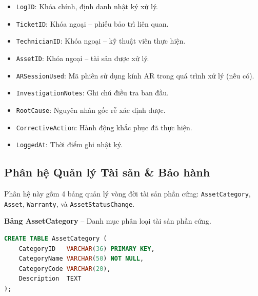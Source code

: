 \begin{itemize}[leftmargin=2em]
    \item \texttt{LogID}: Khóa chính, định danh nhật ký xử lý.
    \item \texttt{TicketID}: Khóa ngoại -- phiếu bảo trì liên quan.
    \item \texttt{TechnicianID}: Khóa ngoại -- kỹ thuật viên thực hiện.
    \item \texttt{AssetID}: Khóa ngoại -- tài sản được xử lý.
    \item \texttt{ARSessionUsed}: Mã phiên sử dụng kính AR trong quá trình xử lý (nếu có).
    \item \texttt{InvestigationNotes}: Ghi chú điều tra ban đầu.
    \item \texttt{RootCause}: Nguyên nhân gốc rễ xác định được.
    \item \texttt{CorrectiveAction}: Hành động khắc phục đã thực hiện.
    \item \texttt{LoggedAt}: Thời điểm ghi nhật ký.
\end{itemize}

\subsection{Phân hệ Quản lý Tài sản \& Bảo hành}

Phân hệ này gồm 4 bảng quản lý vòng đời tài sản phần cứng: \texttt{AssetCategory}, \texttt{Asset}, \texttt{Warranty}, và \texttt{AssetStatusChange}.

\vspace{0.5em}
\noindent\textbf{Bảng AssetCategory} -- Danh mục phân loại tài sản phần cứng.

\begin{tcolorbox}[colback=gray!5, colframe=gray!60, title={\textbf{CREATE TABLE AssetCategory}}, fonttitle=\bfseries\small, boxrule=0.5pt, arc=2pt]
\begin{lstlisting}[language=SQL, basicstyle=\ttfamily\small, breaklines=true, showstringspaces=false, keywordstyle=\bfseries\color{blue!70!black}, stringstyle=\color{red!70!black}, commentstyle=\itshape\color{green!50!black}]
CREATE TABLE AssetCategory (
    CategoryID   VARCHAR(36) PRIMARY KEY,
    CategoryName VARCHAR(50) NOT NULL,
    CategoryCode VARCHAR(20),
    Description  TEXT
);
\end{lstlisting}
\end{tcolorbox}

